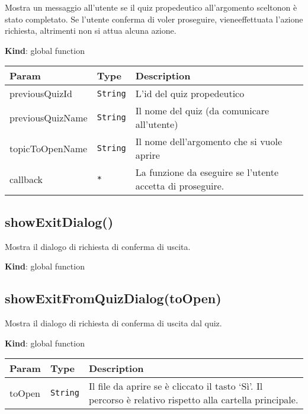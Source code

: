 Mostra un messaggio all'utente se il quiz propedeutico all'argomento
sceltonon è stato completato. Se l'utente conferma di voler proseguire,
vieneeffettuata l'azione richiesta, altrimenti non si attua alcuna
azione.

\textbf{Kind}: global function

\begin{tabularx}{\textwidth}{XXX}
\toprule
Param & Type & Description\tabularnewline
\midrule
\endhead
previousQuizId & \texttt{String} & L'id del quiz
propedeutico\tabularnewline
previousQuizName & \texttt{String} & Il nome del quiz (da comunicare
all'utente)\tabularnewline
topicToOpenName & \texttt{String} & Il nome dell'argomento che si vuole
aprire\tabularnewline
callback & \texttt{*} & La funzione da eseguire se l'utente accetta di
proseguire.\tabularnewline
\bottomrule
\end{tabularx}

\protect\hypertarget{showExitDialog}{}{}

\hypertarget{showexitdialog}{%
\subsection{showExitDialog()}\label{showexitdialog}}

Mostra il dialogo di richiesta di conferma di uscita.

\textbf{Kind}: global function\\
\protect\hypertarget{showExitFromQuizDialog}{}{}

\hypertarget{showexitfromquizdialogtoopen}{%
\subsection{showExitFromQuizDialog(toOpen)}\label{showexitfromquizdialogtoopen}}

Mostra il dialogo di richiesta di conferma di uscita dal quiz.

\textbf{Kind}: global function

\begin{tabularx}{\textwidth}{XXX}
\toprule
\begin{minipage}[b]{0.30\columnwidth}\raggedright
Param\strut
\end{minipage} & \begin{minipage}[b]{0.30\columnwidth}\raggedright
Type\strut
\end{minipage} & \begin{minipage}[b]{0.30\columnwidth}\raggedright
Description\strut
\end{minipage}\tabularnewline
\midrule
\endhead
\begin{minipage}[t]{0.30\columnwidth}\raggedright
toOpen\strut
\end{minipage} & \begin{minipage}[t]{0.30\columnwidth}\raggedright
\texttt{String}\strut
\end{minipage} & \begin{minipage}[t]{0.30\columnwidth}\raggedright
Il file da aprire se è cliccato il tasto `Sì'. Il percorso è relativo
rispetto alla cartella principale.\strut
\end{minipage}\tabularnewline
\bottomrule
\end{tabularx}

